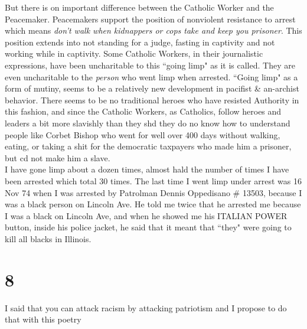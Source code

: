 But there is on important difference between the Catholic Worker and the Peacemaker. Peacemakers support the position of nonviolent resistance to arrest which means \emph{don't walk when kidnappers or cops take and keep you prisoner}. This position extends into not standing for a judge, fasting in captivity and not working while in captivity. Some Catholic Workers, in their journalistic expressions, have been uncharitable to this ``going limp" as it is called. They are even uncharitable to the \emph{person} who went limp when arrested. ``Going limp" as a form of mutiny, seems to be a relatively new development in pacifist \& an-archist behavior. There seems to be no traditional heroes who have resisted Authority in this fashion, and since the Catholic Workers, as Catholics, follow heroes and leaders a bit more slavishly than they shd they do no know how to understand people like Corbet Bishop who went for well over 400 days without walking, eating, or taking a shit for the democratic taxpayers who made him a prisoner, but cd not make him a slave.\\
I have gone limp about a dozen times, almost hald the number of times I have been arrested which total 30 times. The last time I went limp under arrest was 16 Nov 74 when I was arrested by Patrolman Dennis Oppedisano \# 13503, because I was a black person on Lincoln Ave. He told me twice that he arrested me because I was a black on Lincoln Ave, and when he showed me his ITALIAN POWER button, inside his police jacket, he said that it meant that ``they" were going to kill all blacks in Illinois.

\section*{8}
I said that you can attack racism by attacking patriotism and I propose to do that with this poetry

